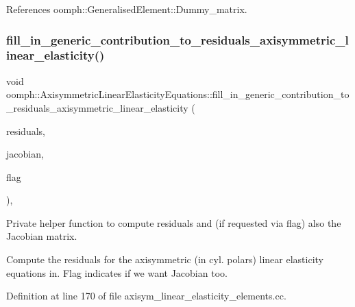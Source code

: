 References oomph\+::\+Generalised\+Element\+::\+Dummy\+\_\+matrix.

\mbox{\label{classoomph_1_1AxisymmetricLinearElasticityEquations_a47f493fe9f183efebce35bd708cbb78d}} 
\subsubsection{\texorpdfstring{fill\+\_\+in\+\_\+generic\+\_\+contribution\+\_\+to\+\_\+residuals\+\_\+axisymmetric\+\_\+linear\+\_\+elasticity()}{fill\_in\_generic\_contribution\_to\_residuals\_axisymmetric\_linear\_elasticity()}}
{\footnotesize\ttfamily void oomph\+::\+Axisymmetric\+Linear\+Elasticity\+Equations\+::fill\+\_\+in\+\_\+generic\+\_\+contribution\+\_\+to\+\_\+residuals\+\_\+axisymmetric\+\_\+linear\+\_\+elasticity (\begin{DoxyParamCaption}\item[{\hyperlink{classoomph_1_1Vector}{Vector}$<$ double $>$ \&}]{residuals,  }\item[{\hyperlink{classoomph_1_1DenseMatrix}{Dense\+Matrix}$<$ double $>$ \&}]{jacobian,  }\item[{unsigned}]{flag }\end{DoxyParamCaption})\hspace{0.3cm}{\ttfamily [protected]}, {\ttfamily [virtual]}}



Private helper function to compute residuals and (if requested via flag) also the Jacobian matrix. 

Compute the residuals for the axisymmetric (in cyl. polars) linear elasticity equations in. Flag indicates if we want Jacobian too. 

Definition at line 170 of file axisym\+\_\+linear\+\_\+elasticity\+\_\+elements.\+cc.



